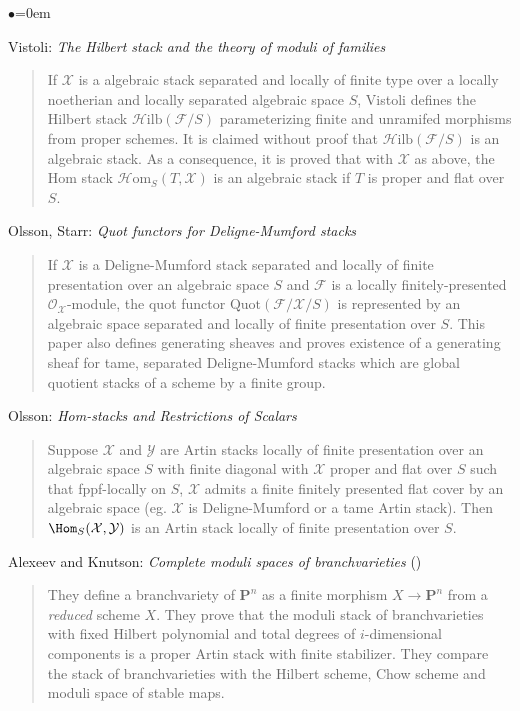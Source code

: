 \begin{list}{$\bullet$}{\leftmargin=0em}
\item Vistoli: \emph{The Hilbert stack and the theory of moduli of families}
\cite{vistoli_hilbert}
\begin{quote}
If $\mathcal{X}$ is a algebraic stack separated and locally of finite type
over a locally noetherian and locally separated algebraic space $S$, Vistoli
defines the Hilbert stack $\mathcal{H}\text{ilb}(\mathcal{F} / S)$
parameterizing finite and unramifed morphisms from proper schemes.
It is claimed without proof that $\mathcal{H}\text{ilb}(\mathcal{F} / S)$
is an algebraic stack.  As a consequence, it is proved that with $\mathcal{X}$
as above, the Hom stack $\mathcal{H} \text{om}_S(T, \mathcal{X})$ is an
algebraic stack if $T$ is proper and flat over $S$.
\end{quote}
\smallskip
\item Olsson, Starr: \emph{Quot functors for Deligne-Mumford stacks}
\cite{olsson-starr}
\begin{quote}
If $\mathcal{X}$ is a Deligne-Mumford stack separated and locally of finite
presentation over an algebraic space $S$ and $\mathcal{F}$ is a locally
finitely-presented $\mathcal{O}_\mathcal{X}$-module, the quot functor
$\text{Quot}(\mathcal{F} / \mathcal{X} / S)$ is represented by an algebraic
space separated and locally of finite presentation over $S$.  This paper
also defines generating sheaves and proves existence of a generating sheaf
for tame, separated Deligne-Mumford stacks which are global quotient stacks
of a scheme by a finite group.
\end{quote}
\smallskip

\item Olsson: \emph{Hom-stacks and Restrictions of Scalars}
\cite{olsson_homstacks}
\begin{quote}
Suppose $\mathcal{X}$ and $\mathcal{Y}$ are Artin stacks locally of finite
presentation over an algebraic space $S$ with finite diagonal with
$\mathcal{X}$ proper and flat over $S$ such that fppf-locally on $S$,
$\mathcal{X}$ admits a finite finitely presented flat cover by an algebraic
space (eg. $\mathcal{X}$ is Deligne-Mumford or a tame Artin stack).
Then $\Hom_S(\mathcal{X}, \mathcal{Y})$ is an Artin stack locally
of finite presentation over $S$.
\end{quote}
\smallskip

\item Alexeev and Knutson:  \emph{Complete moduli spaces of branchvarieties}
(\cite{alexeev-knutson})
\begin{quote}
They define a branchvariety of $\mathbf{P}^n$ as a finite morphism
$X \rightarrow \mathbf{P}^n$ from a \emph{reduced} scheme $X$.  They prove
that the moduli stack of branchvarieties with fixed Hilbert polynomial and
total degrees of $i$-dimensional components is a proper Artin stack with
finite stabilizer.  They compare the stack of branchvarieties with the
Hilbert scheme, Chow scheme and moduli space of stable maps.
\end{quote}
\smallskip


\end{list}
